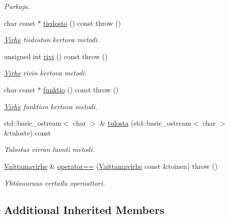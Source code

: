 \begin{DoxyCompactItemize}
\begin{DoxyCompactList}\small\item\em Purkaja. \end{DoxyCompactList}\item 
char const $\ast$ \hyperlink{class_julkinen_1_1_vaittamavirhe_a8624cd880b8466188ef6de480431dffb}{tiedosto} () const   throw ()
\begin{DoxyCompactList}\small\item\em \hyperlink{class_julkinen_1_1_virhe}{Virhe} tiedoston kertova metodi. \end{DoxyCompactList}\item 
unsigned int \hyperlink{class_julkinen_1_1_vaittamavirhe_abc571141231b3fa789ae41d2d80642ef}{rivi} () const   throw ()
\begin{DoxyCompactList}\small\item\em \hyperlink{class_julkinen_1_1_virhe}{Virhe} rivin kertova metodi. \end{DoxyCompactList}\item 
char const $\ast$ \hyperlink{class_julkinen_1_1_vaittamavirhe_afd5de6b5639336288d28fd077c84a20c}{funktio} () const   throw ()
\begin{DoxyCompactList}\small\item\em \hyperlink{class_julkinen_1_1_virhe}{Virhe} funktion kertova metodi. \end{DoxyCompactList}\item 
std\+::basic\+\_\+ostream$<$ char $>$ \& \hyperlink{class_julkinen_1_1_vaittamavirhe_a5ca289035ecde35b1b1576d1c9219acd}{tulosta} (std\+::basic\+\_\+ostream$<$ char $>$ \&tuloste) const 
\begin{DoxyCompactList}\small\item\em Tulostus virran luonti metodi. \end{DoxyCompactList}\item 
\hyperlink{class_julkinen_1_1_vaittamavirhe}{Vaittamavirhe} \& \hyperlink{class_julkinen_1_1_vaittamavirhe_a182a03c5e807a02c1ac32a5474f34821}{operator==} (\hyperlink{class_julkinen_1_1_vaittamavirhe}{Vaittamavirhe} const \&toinen)  throw ()
\begin{DoxyCompactList}\small\item\em Yhtäsuuruus vertailu operaattori. \end{DoxyCompactList}\end{DoxyCompactItemize}
\subsection*{Additional Inherited Members}


